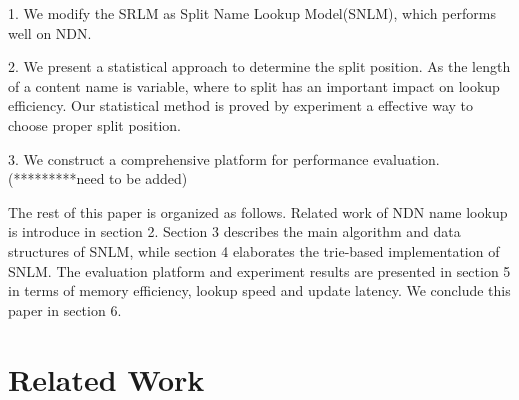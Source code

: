 \documentclass[twocolumn]{article}
\begin{document}
\setlength{\parskip}{5pt}
1. We modify the SRLM as Split Name Lookup Model(SNLM), which performs well on NDN.
\setlength{\parskip}{0pt}

2. We present a statistical approach to determine the split position. As the length of a content name is variable, where to split has an important impact on lookup efficiency. Our statistical method is proved by experiment a effective way to choose proper split position.

3. We construct a comprehensive platform for performance evaluation.(*********need to be added)

\setlength{\parskip}{5pt}
The rest of this paper is organized as follows. Related work of NDN name lookup is introduce in section 2. Section 3 describes the main algorithm and data structures of SNLM, while section 4 elaborates the trie-based implementation of SNLM. The evaluation platform and experiment results are presented in section 5 in terms of memory efficiency, lookup speed and update latency. We conclude this paper in section 6.
\setlength{\parskip}{0pt}

\section{Related Work}
\end{document}
